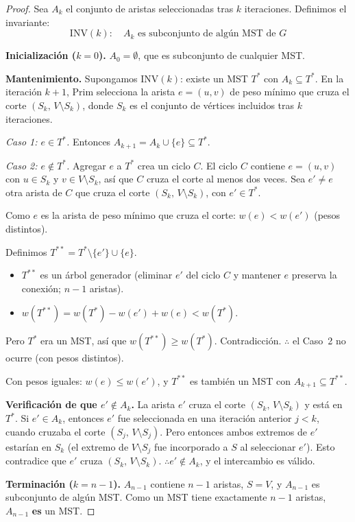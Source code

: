 \documentclass[11pt, letterpaper]{article}
\theoremstyle{definition}
\theoremstyle{plain}
\theoremstyle{remark}
\begin{document}
\begin{proof}
Sea $A_k$ el conjunto de aristas seleccionadas tras $k$ iteraciones.
Definimos el invariante:
\[
  \mathrm{INV}(k):\quad
  A_k \text{ es subconjunto de algún MST de } G
\]

\textbf{Inicialización ($k = 0$).} $A_0 = \emptyset$, que es
subconjunto de cualquier MST. \checkmark

\textbf{Mantenimiento.} Supongamos $\mathrm{INV}(k)$: existe un MST
$T^*$ con $A_k \subseteq T^*$. En la iteración $k + 1$, Prim
selecciona la arista $e = (u, v)$ de peso mínimo que cruza el corte
$(S_k,\, V \setminus S_k)$, donde $S_k$ es el conjunto de vértices
incluidos tras $k$ iteraciones.

\emph{Caso 1: $e \in T^*$.} Entonces
$A_{k+1} = A_k \cup \{e\} \subseteq T^*$. \checkmark

\emph{Caso 2: $e \notin T^*$.} Agregar $e$ a $T^*$ crea un ciclo
$C$. El ciclo $C$ contiene $e = (u, v)$ con $u \in S_k$ y
$v \in V \setminus S_k$, así que $C$ cruza el corte al menos dos
veces. Sea $e' \neq e$ otra arista de $C$ que cruza el corte
$(S_k,\, V \setminus S_k)$, con $e' \in T^*$.

Como $e$ es la arista de peso mínimo que cruza el corte:
$w(e) < w(e')$ (pesos distintos).

Definimos $T^{**} = T^* \setminus \{e'\} \cup \{e\}$.

\begin{itemize}
  \item $T^{**}$ es un árbol generador (eliminar $e'$ del ciclo $C$
    y mantener $e$ preserva la conexión; $n - 1$ aristas).
  \item $w(T^{**}) = w(T^*) - w(e') + w(e) < w(T^*)$.
\end{itemize}

Pero $T^*$ era un MST, así que $w(T^{**}) \geq w(T^*)$.
Contradicción. $\therefore$ el Caso~2 no ocurre (con pesos
distintos).

Con pesos iguales: $w(e) \leq w(e')$, y $T^{**}$ es también un MST
con $A_{k+1} \subseteq T^{**}$. \checkmark

\textbf{Verificación de que $e' \notin A_k$.} La arista $e'$ cruza
el corte $(S_k,\, V \setminus S_k)$ y está en $T^*$. Si
$e' \in A_k$, entonces $e'$ fue seleccionada en una iteración
anterior $j < k$, cuando cruzaba el corte
$(S_j,\, V \setminus S_j)$. Pero entonces ambos extremos de $e'$
estarían en $S_k$ (el extremo de $V \setminus S_j$ fue incorporado a
$S$ al seleccionar $e'$). Esto contradice que $e'$ cruza
$(S_k,\, V \setminus S_k)$. $\therefore e' \notin A_k$, y el
intercambio es válido. \checkmark

\textbf{Terminación ($k = n - 1$).} $A_{n-1}$ contiene $n - 1$
aristas, $S = V$, y $A_{n-1}$ es subconjunto de algún MST. Como un
MST tiene exactamente $n - 1$ aristas, $A_{n-1}$ \textbf{es} un MST.
\end{proof}
\end{document}

